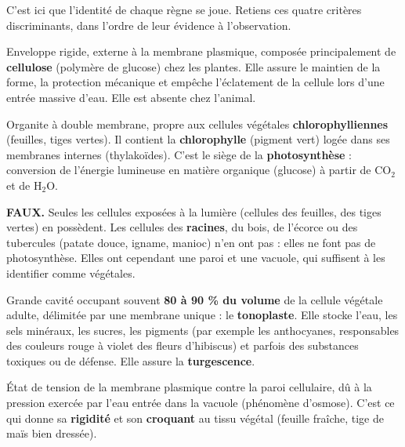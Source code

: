 \documentclass[11pt]{article}
\newcounter{popsec}
\newcounter{popsub}
\newcommand{\courssub}[1]{%
  \stepcounter{popsub}%
  \par\vspace{9pt}\noindent{\popxbold\fontsize{11.5}{13}\selectfont\color{popink}{\color{poporange}\thepopsec.\thepopsub}\hspace{6pt}#1}\par\nopagebreak\vspace{4pt}
}
\begin{document}
\courssub{Les quatre différences majeures}

C'est ici que l'identité de chaque règne se joue. Retiens ces quatre critères discriminants, dans l'ordre de leur évidence à l'observation.

\begin{definition}
Enveloppe rigide, externe à la membrane plasmique, composée principalement de \textbf{cellulose} (polymère de glucose) chez les plantes. Elle assure le maintien de la forme, la protection mécanique et empêche l'éclatement de la cellule lors d'une entrée massive d'eau. Elle est absente chez l'animal.
\end{definition}

\begin{definition}[Chloroplaste]
Organite à double membrane, propre aux cellules végétales \textbf{chlorophylliennes} (feuilles, tiges vertes). Il contient la \textbf{chlorophylle} (pigment vert) logée dans ses membranes internes (thylakoïdes). C'est le siège de la \textbf{photosynthèse} : conversion de l'énergie lumineuse en matière organique (glucose) à partir de CO$_2$ et de H$_2$O.
\end{definition}

\begin{attention}
\textbf{FAUX.} Seules les cellules exposées à la lumière (cellules des feuilles, des tiges vertes) en possèdent. Les cellules des \textbf{racines}, du bois, de l'écorce ou des tubercules (patate douce, igname, manioc) n'en ont pas : elles ne font pas de photosynthèse. Elles ont cependant une paroi et une vacuole, qui suffisent à les identifier comme végétales.
\end{attention}

\begin{definition}
Grande cavité occupant souvent \textbf{80 à 90 \% du volume} de la cellule végétale adulte, délimitée par une membrane unique : le \textbf{tonoplaste}. Elle stocke l'eau, les sels minéraux, les sucres, les pigments (par exemple les anthocyanes, responsables des couleurs rouge à violet des fleurs d'hibiscus) et parfois des substances toxiques ou de défense. Elle assure la \textbf{turgescence}.
\end{definition}

\begin{definition}[Turgescence]
État de tension de la membrane plasmique contre la paroi cellulaire, dû à la pression exercée par l'eau entrée dans la vacuole (phénomène d'osmose). C'est ce qui donne sa \textbf{rigidité} et son \textbf{croquant} au tissu végétal (feuille fraîche, tige de maïs bien dressée).
\end{definition}
\end{document}
